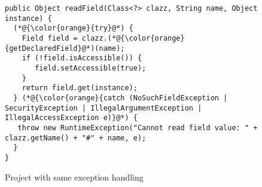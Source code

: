 \begin{figure}[t] %
	\centering
\begin{lstlisting}[]
public Object readField(Class<?> clazz, String name, Object instance) {
  (*@{\color{orange}{try}@*) {
    Field field = clazz.(*@{\color{orange}{getDeclaredField}@*)(name);
    if (!field.isAccessible()) {
       field.setAccessible(true);
    }
    return field.get(instance);
  } (*@{\color{orange}{catch (NoSuchFieldException | SecurityException | IllegalArgumentException | IllegalAccessException e)}@*) {
   throw new RuntimeException("Cannot read field value: " + clazz.getName() + "#" + name, e);
  }
}
\end{lstlisting}
        \vspace{-16pt}
        \caption{Project  with same exception handling}
        \label{fig:example3}
\end{figure}
